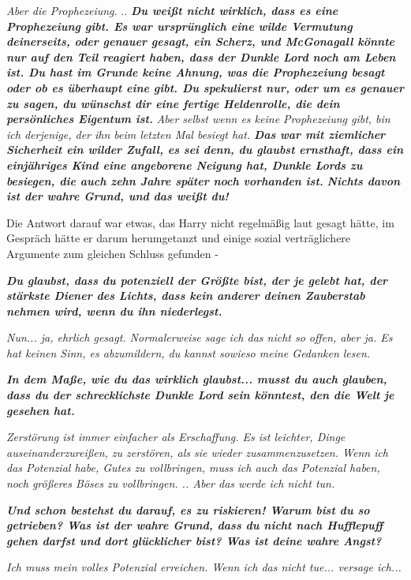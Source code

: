 \emph{Aber die Prophezeiung.} .. \textbf{\emph{\glqq Du weißt nicht wirklich,
dass es eine Prophezeiung gibt. Es war ursprünglich eine wilde Vermutung
deinerseits, oder genauer gesagt, ein Scherz, und McGonagall könnte nur auf den
Teil reagiert haben, dass der Dunkle Lord noch am Leben ist. Du hast im Grunde
keine Ahnung, was die Prophezeiung besagt oder ob es überhaupt eine gibt. Du
spekulierst nur, oder um es genauer zu sagen, du wünschst dir eine fertige
Heldenrolle, die dein persönliches Eigentum ist.\grqq{}}} \emph{Aber selbst wenn
es keine Prophezeiung gibt, bin ich derjenige, der ihn beim letzten Mal besiegt
hat. } \textbf{\emph{\glqq Das war mit ziemlicher Sicherheit ein wilder Zufall,
es sei denn, du glaubst ernsthaft, dass ein einjähriges Kind eine angeborene
Neigung hat, Dunkle Lords zu besiegen, die auch zehn Jahre später noch vorhanden
ist. }}\textbf{\emph{Nichts davon ist der wahre Grund, und das weißt
du!\grqq{}}}

Die Antwort darauf war etwas, das Harry nicht regelmäßig laut gesagt hätte, im
Gespräch hätte er darum herumgetanzt und einige sozial verträglichere Argumente
zum gleichen Schluss gefunden -

\textbf{\emph{\glqq Du glaubst, dass du potenziell der Größte bist, der je
gelebt hat, der stärkste Diener des Lichts, dass kein anderer deinen Zauberstab
nehmen wird, wenn du ihn niederlegst.\grqq{}}}

\emph{Nun... ja, ehrlich gesagt. Normalerweise sage ich das nicht so offen, aber
ja. Es hat keinen Sinn, es abzumildern, du kannst sowieso meine Gedanken lesen.}

\textbf{\emph{\glqq In dem Maße, wie du das wirklich glaubst... musst du auch
glauben, dass du der schrecklichste Dunkle Lord sein könntest, den die Welt je
gesehen hat.\grqq{}}}

\emph{Zerstörung ist immer einfacher als Erschaffung. Es ist leichter, Dinge
auseinanderzureißen, zu zerstören, als sie wieder zusammenzusetzen. Wenn ich das
Potenzial habe, Gutes zu vollbringen, muss ich auch das Potenzial haben, noch
größeres Böses zu vollbringen. .. Aber das werde ich nicht tun.}

\textbf{\emph{\glqq Und schon bestehst du darauf, es zu riskieren! Warum bist du
so getrieben? Was ist der wahre Grund, dass du nicht nach Hufflepuff gehen
darfst und dort glücklicher bist? Was ist deine wahre Angst?\grqq{}}}

\emph{Ich muss mein volles Potenzial erreichen. Wenn ich das nicht tue...
versage ich...}

